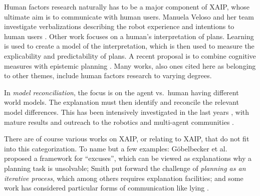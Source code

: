 Human factors research naturally has to be a major component of XAIP,
whose ultimate aim is to communicate with human users. Manuela Veloso
and her team investigate verbalizations describing the robot
experience and intentions to human users
\cite{rosenthal:etal:ijcai-16}. Other work \cite{zhang:etal:icra-17}
focuses on a human's interpretation of plans. Learning is used to
create a model of the interpretation, which is then used to measure
the explicability and predictability of plans. A recent proposal is to
combine cognitive measures with epistemic planning
\cite{petrick:etal:xaip-19}. Many works, also ones cited here as
belonging to other themes, include human factors research to varying
degrees.

In \emph{model reconciliation}, the focus is on the agent vs.\ human
having different world models. The explanation must then identify and
reconcile the relevant model differences. This has been intensively
investigated in the last years
\cite{chakraborti:etal:ijcai-17,SreedharanCK18,KulkarniZCVZK19,sreedharan:etal:xaip-19},
with mature results and outreach to the robotics
\cite{chakraborti:etal:hri-19} and multi-agent communities
\cite{kambhampati:aamas-19}.

There are of course various works on XAIP, or relating to XAIP, that
do not fit into this categorization. To name but a few examples:
G{\"{o}}belbecker et al.\ \cite{goebelbecker:etal:icaps-10} proposed a
framework for ``excuses'', which can be viewed as explanations why a
planning task is unsolvable; Smith \cite{smith:aaai-12} put forward
the challenge of \emph{planning as an iterative process}, which among
others requires explanation facilities; and some work has considered
particular forms of communication like lying
\cite{chakraborti:kambhampati:xaip-19}.










